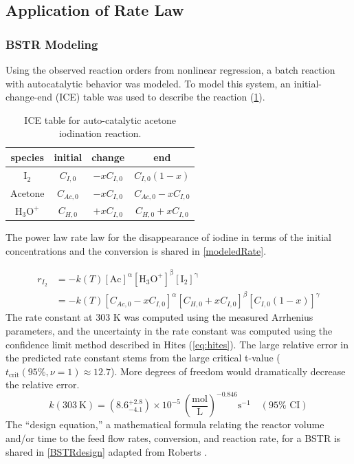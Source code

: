 \documentclass{article}
\begin{document}
\subsection{Application of Rate Law}
\subsubsection{BSTR Modeling}

Using the observed reaction orders from nonlinear regression, a batch reaction with autocatalytic behavior was modeled. To model this system, an initial-change-end (ICE) table \autocite{kinetics_textbook} was used to describe the reaction (\cref{tab:ICEtable}). 


\begin{table}[H]
    \caption{ICE table for auto-catalytic acetone iodination reaction.}
    
    \centering
    \begin{tabular}{cccc}
    \toprule
    species & initial & change & end \\
    \midrule
    $\mathrm{I_2}$ & $C_{I,0}$ & $-x C_{I,0}$ & $C_{I,0} (1-x)$ \\
    $\mathrm{Acetone}$ & $C_{Ac,0}$ & $-x C_{I,0}$ & $C_{Ac,0} -x C_{I,0}$ \\
    $\mathrm{H_3O^+}$ & $C_{H,0}$ & $+x C_{I,0}$ & $C_{H,0} +x C_{I,0}$ \\
    \bottomrule
    \end{tabular}
    \label{tab:ICEtable}
\end{table}

The power law rate law for the disappearance of iodine in terms of the initial concentrations and the conversion is shared in \cref{modeledRate}. 

\begin{align} 
    r_{I_2} &= - k(T) \mathrm{[Ac]^\alpha  [H_3O^+]^\beta [I_2]^\gamma} \\
    &= - k(T) \left[ C_{Ac,0} -x C_{I,0} \right]^\alpha [C_{H,0} +x C_{I,0}]^\beta [C_{I,0} (1-x)]^\gamma \label{modeledRate}
\end{align}
The rate constant at 303 K was computed using the measured Arrhenius parameters, and the uncertainty in the rate constant was computed using the confidence limit method described in Hites \autocite{hites_calculating_2017} (\cref{eq:hites}). The large relative error in the predicted rate constant stems from the large critical t-value ($t_\text{crit}(95\%, \nu=1) \approx 12.7$). More degrees of freedom would dramatically decrease the relative error.
\begin{equation}
    k(303 \  \text{K}) = \left( 8.6^{+2.8}_{-4.1} \right) \times 10^{-5}\ \left(\frac{\text{mol}}{\text{L}}\right)^{-0.846} \text{s}^{-1} \quad (95\% \text{ CI}) \label{eq:hites}
\end{equation}
The ``design equation,'' a mathematical formula relating the reactor volume and/or time to the feed flow rates, conversion, and reaction rate, for a BSTR is shared in \cref{BSTRdesign} adapted from Roberts  \autocite{kinetics_textbook}. 
\end{document}
